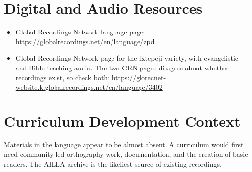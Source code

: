 \documentclass[12pt]{article}
\begin{document}
\section{Digital and Audio Resources}
\begin{itemize}
\item Global Recordings Network language page: \url{https://globalrecordings.net/en/language/zpd}
\item Global Recordings Network page for the Ixtepeji variety, with evangelistic and Bible-teaching audio. The two GRN pages disagree about whether recordings exist, so check both: \url{https://glorecnet-website.k.globalrecordings.net/en/language/3402}
\end{itemize}

\section{Curriculum Development Context}
Materials in the language appear to be almost absent. A curriculum would first need community-led orthography work, documentation, and the creation of basic readers. The AILLA archive is the likeliest source of existing recordings.
\end{document}
